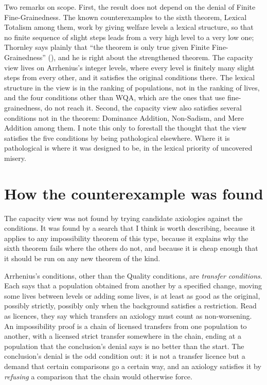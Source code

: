 \documentclass[
  11pt,
  letterpaper,
  DIV=11,
  numbers=noendperiod,
  twoside]{scrartcl}
\begin{document}
Two remarks on scope. First, the result does not depend on the denial of
Finite Fine-Grainedness. The known counterexamples to the sixth theorem,
Lexical Totalism among them, work by giving welfare levels a lexical
structure, so that no finite sequence of slight steps leads from a very
high level to a very low one; Thornley says plainly that ``the theorem
is only true given Finite Fine-Grainedness''
(), and he is right
about the strengthened theorem. The capacity view lives on Arrhenius's
integer levels, where every level is finitely many slight steps from
every other, and it satisfies the original conditions there. The lexical
structure in the view is in the ranking of populations, not in the
ranking of lives, and the four conditions other than WQA, which are the
ones that use fine-grainedness, do not reach it. Second, the capacity
view also satisfies several conditions not in the theorem: Dominance
Addition, Non-Sadism, and Mere Addition among them. I note this only to
forestall the thought that the view satisfies the five conditions by
being pathological elsewhere. Where it is pathological is where it was
designed to be, in the lexical priority of uncovered misery.

\section{How the counterexample was found}\label{sec-method}

The capacity view was not found by trying candidate axiologies against
the conditions. It was found by a search that I think is worth
describing, because it applies to any impossibility theorem of this
type, because it explains why the sixth theorem fails where the others
do not, and because it is cheap enough that it should be run on any new
theorem of the kind.

Arrhenius's conditions, other than the Quality conditions, are
\emph{transfer conditions}. Each says that a population obtained from
another by a specified change, moving some lives between levels or
adding some lives, is at least as good as the original, possibly
strictly, possibly only when the background satisfies a restriction.
Read as licences, they say which transfers an axiology must count as
non-worsening. An impossibility proof is a chain of licensed transfers
from one population to another, with a licensed strict transfer
somewhere in the chain, ending at a population that the conclusion's
denial says is no better than the start. The conclusion's denial is the
odd condition out: it is not a transfer licence but a demand that
certain comparisons go a certain way, and an axiology satisfies it by
\emph{refusing} a comparison that the chain would otherwise force.
\end{document}
